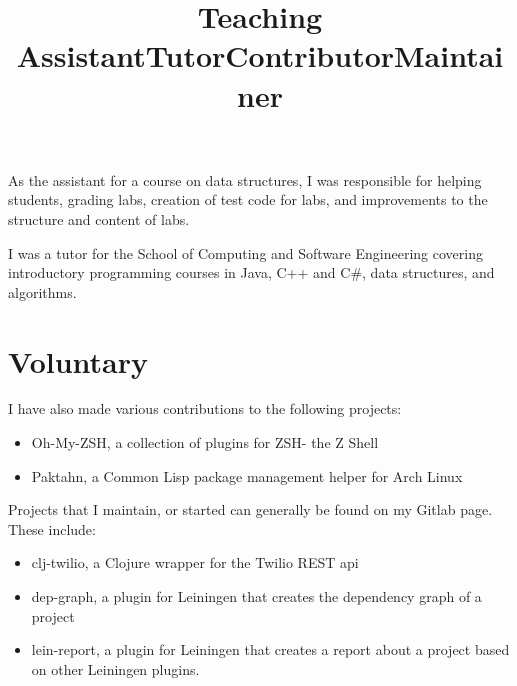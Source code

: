 \documentclass[margintitle,line]{res}
\renewcommand{\subsection}[1]{\section{\normalfont #1}}
\begin{document}
\begin{resume}
\title{Teaching Assistant}
\begin{position}
 As the assistant for a course on data structures, I was responsible
 for helping students, grading labs, creation of test code for labs,
 and improvements to the structure and content of labs.
\end{position}

\title{Tutor}
\begin{position}
I was a tutor for the School of Computing and Software Engineering
covering introductory programming courses in Java, C++ and C\#, data
structures, and algorithms.
\end{position}

%
\subsection{Voluntary}

\title{Contributor}
\begin{position}
I have also made various contributions to the following projects:
\begin{itemize}
\item{Oh-My-ZSH, a collection of plugins for ZSH- the Z Shell}
\item{Paktahn, a Common Lisp package management helper for Arch Linux}
\end{itemize}
\end{position}

\title{Maintainer}
\begin{position}
Projects that I maintain, or started can generally be found on my
Gitlab page. These include:
\begin{itemize}
\item{clj-twilio, a Clojure wrapper for the Twilio REST api}
\item{dep-graph, a plugin for Leiningen that creates the dependency
    graph of a project}
\item{lein-report, a plugin for Leiningen that creates a report about
    a project based on other Leiningen plugins.}
\end{itemize}
\end{position}



\end{resume}
\end{document}
